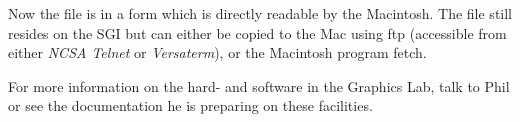 Now the file is in a form which is directly readable by the Macintosh.  The
file still resides on the SGI but can either be copied to the Mac using ftp
(accessible from either {\em NCSA Telnet\/} or {\em Versaterm\/}), or
the Macintosh program fetch.

For more information on the hard- and software in the Graphics Lab, talk to
Phil or see the documentation he is preparing on these facilities.

